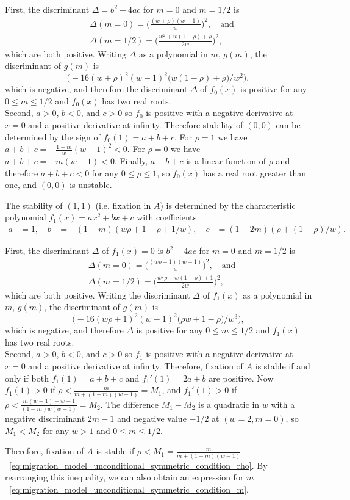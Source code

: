 \documentclass[14pt]{extarticle}
\begin{document}
First, the discriminant $\Delta = b^2-4ac$ for $m=0$ and $m=1/2$ is
\begin{equation}\begin{aligned}
&\Delta(m=0) = \Big(\frac{(w + \rho) (w-1)}{w}\Big)^2, \quad \text{and} \\
&\Delta(m=1/2) = \Big(\frac{w^2 + w(1-\rho) + \rho}{2 w}\Big)^2,
\end{aligned}\end{equation}
which are both positive.
Writing $\Delta$ as a polynomial in $m$, $g(m)$, the discriminant of $g(m)$ is 
$$
\big(- 16 (w + \rho)^2 (w - 1)^2 \big(w (1 - \rho) + \rho \big) / w^2\big),
$$
which is negative, and therefore the discriminant $\Delta$ of $f_0(x)$ is positive for any $0 \le m \le 1/2$ and $f_0(x)$ has two real roots. \\
Second, $a>0$, $b<0$, and $c>0$ so $f_0$ is positive with a negative derivative at $x=0$ and  a positive derivative at infinity.
Therefore stability of $(0,0)$ can be determined by the sign of $f_0(1)=a+b+c$.
For $\rho=1$ we have $a+b+c=-\frac{1-m}{w}(w-1)^2<0$.
For $\rho=0$ we have $a+b+c=-m(w-1)<0$.
Finally, $a+b+c$ is a linear function of $\rho$ and therefore $a+b+c<0$ for any $0 \le \rho \le 1$, so $f_0(x)$ has a real root greater than one, and $(0,0)$ is unstable.

The stability of $(1,1)$ (i.e. fixation in $A$) is determined by the characteristic polynomial $f_1(x)=ax^2+bx+c$ with coefficients
\begin{equation}
\begin{aligned}
a &= 1, \quad
b &= -(1 - m) (w\rho + 1 - \rho + 1/w), \quad
c &=  (1 - 2m)(\rho + (1-\rho)/w).
\end{aligned}
\end{equation}

First, the discriminant $\Delta$ of $f_1(x)=0$ is $b^2-4ac$ for $m=0$ and $m=1/2$ is
\begin{equation}\begin{aligned}
&\Delta(m=0) = \Big(\frac{(w \rho + 1) (w-1)}{w}\Big)^2, \quad \text{and} \\
&\Delta(m=1/2) = \Big(\frac{w^2 \rho + w(1-\rho) + 1}{2 w}\Big)^2,
\end{aligned}\end{equation}
which are both positive. 
Writing the discriminant $\Delta$ of $f_1(x)$ as a polynomial in $m$, $g(m)$, the discriminant of $g(m)$ is
$$
\big(- 16 (w\rho + 1)^2 (w - 1)^2 \big(\rho w + 1 - \rho \big) / w^3\big),
$$
which is negative, and therefore $\Delta$ is positive for any $0 \le m \le 1/2$ and $f_1(x)$ has two real roots. \\
Second, $a>0$, $b<0$, and $c>0$ so $f_1$ is positive with a negative derivative at $x=0$ and  a positive derivative at infinity.
Therefore, fixation of $A$ is stable if and only if both $f_1(1)=a+b+c$ and $f_1'(1)=2a+b$ are positive.
Now $f_1(1)>0$  if $\rho < \frac{m}{m+(1-m)(w-1)}=M_1$, and
$f_1'(1)>0$  if $\rho < \frac{m(w+1)+w-1}{(1-m)w(w-1)}=M_2$.
The difference $M_1-M_2$ is a quadratic in $w$ with a negative discriminant $2m-1$ and negative value $-1/2$ at $(w=2, m=0)$, so $M_1<M_2$ for any $w>1$ and $0 \le m \le 1/2$.

Therefore, fixation of $A$ is stable if $\rho < M_1 = \frac{m}{m+(1-m)(w-1)}$~\eqref{eq:migration_model_unconditional_symmetric_condition_rho}. By rearranging this inequality, we can also obtain an expression for $m$~\eqref{eq:migration_model_unconditional_symmetric_condition_m}.
\end{document}
